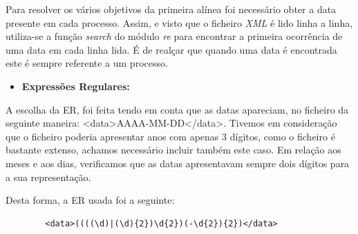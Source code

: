 \documentclass[11pt,a4paper]{report}
\begin{document}
	\qquad Para resolver os vários objetivos da primeira alínea foi necessário obter a data presente em cada processo. Assim, e visto que o ficheiro \textit{XML} é lido linha a linha, utiliza-se a função \textit{search} do módulo \textit{re} para encontrar a primeira ocorrência de uma data em cada linha lida. É de realçar que quando uma data é encontrada este é sempre referente a um processo. 
\vspace{0.7cm}
	\begin{itemize}
	\item \textbf{Expressões Regulares:}
	\end{itemize}
	\qquad A escolha da ER, foi feita tendo em conta que as datas apareciam, no ficheiro da seguinte maneira: \textless data\textgreater AAAA-MM-DD\textless/data\textgreater. Tivemos em consideração que o ficheiro poderia apresentar anos com apenas 3 dígitos, como o ficheiro é bastante extenso, achamos necessário incluir também este caso. Em relação aos meses e aos dias, verificamos que as datas apresentavam sempre dois dígitos para a sua representação.\par
	\qquad Desta forma, a ER usada foi a seguinte: 
	   
	\begin{verbatim}
	    <data>((((\d)|(\d){2})\d{2})(-\d{2}){2})</data>
	 \end{verbatim}                 
                          
\end{document}
